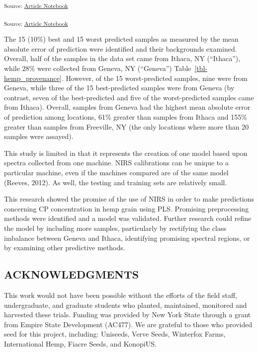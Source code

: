 \documentclass[
]{agujournal2019}
\begin{document}
\textsubscript{Source:
\href{https://rvcrawford.github.io/glowing-system/index.qmd.html}{Article
Notebook}}

\textsubscript{Source:
\href{https://rvcrawford.github.io/glowing-system/index.qmd.html}{Article
Notebook}}

The 15 (10\%) best and 15 worst predicted samples as measured by the
mean absolute error of prediction were identified and their backgrounds
examined. Overall, half of the samples in the data set came from Ithaca,
NY (``Ithaca''), while 28\% were collected from Geneva, NY (``Geneva'')
Table~\ref{tbl-hemp_provenance}. However, of the 15 worst-predicted
samples, nine were from Geneva, while three of the 15 best-predicted
samples were from Geneva (by contrast, seven of the best-predicted and
five of the worst-predicted samples came from Ithaca). Overall, samples
from Geneva had the highest mean absolute error of prediction among
locations, 61\% greater than samples from Ithaca and 155\% greater than
samples from Freeville, NY (the only locations where more than 20
samples were assayed).

This study is limited in that it represents the creation of one model
based upon spectra collected from one machine. NIRS calibrations can be
unique to a particular machine, even if the machines compared are of the
same model (Reeves, 2012). As well, the testing and training sets are
relatively small.

This research showed the promise of the use of NIRS in order to make
predictions concerning CP concentration in hemp grain using PLS.
Promising preprocessing methods were identified and a model was
validated. Further research could refine the model by including more
samples, particularly by rectifying the class imbalance between Geneva
and Ithaca, identifying promising spectral regions, or by examining
other predictive methods.

\subsection{ACKNOWLEDGMENTS}\label{acknowledgments}

This work would not have been possible without the efforts of the field
staff, undergraduate, and graduate students who planted, maintained,
monitored and harvested these trials. Funding was provided by New York
State through a grant from Empire State Development (AC477). We are
grateful to those who provided seed for this project, including:
Uniseeds, Verve Seeds, Winterfox Farms, International Hemp, Fiacre
Seeds, and KonopiUS.
\end{document}
